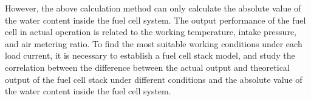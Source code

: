 \par
However, the above calculation method can only calculate the absolute value of the water content inside the fuel cell system. The output performance of the fuel cell in actual operation is related to the working temperature, intake pressure, and air metering ratio. To find the most suitable working conditions under each load current, it is necessary to establish a fuel cell stack model, and study the correlation between the difference between the actual output and theoretical output of the fuel cell stack under different conditions and the absolute value of the water content inside the fuel cell system.
